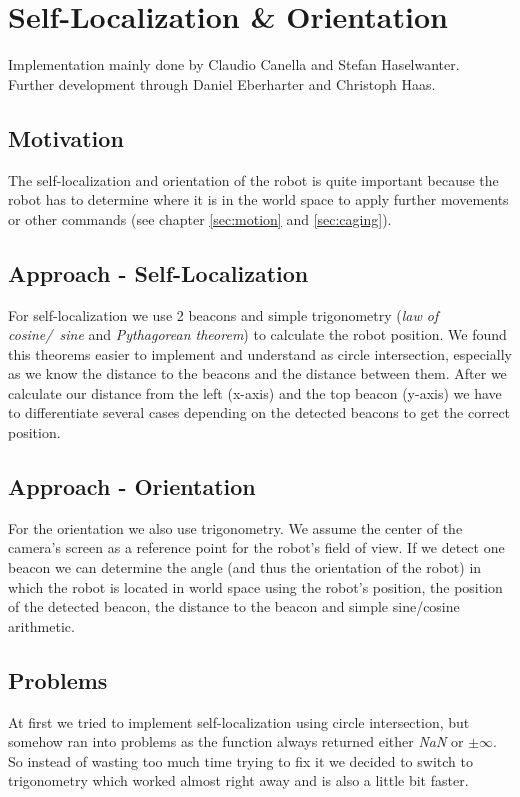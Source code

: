 \documentclass[703031]{iisreport}
\begin{document}
\section{Self-Localization \& Orientation}
\label{sec:localization}
Implementation mainly done by Claudio Canella and Stefan Haselwanter. \\
Further development through Daniel Eberharter and Christoph Haas.

\subsection{Motivation}
The self-localization and orientation of the robot is quite important because the robot has to determine where it is in the world space to apply further movements or other commands (see chapter \ref{sec:motion} and \ref{sec:caging}).

\subsection{Approach - Self-Localization}
For self-localization we use 2 beacons and simple trigonometry (\emph{law of \mbox{cosine}/\ sine} and \emph{Pythagorean theorem}) to calculate the robot position. We found this theorems easier to implement and understand as circle intersection, especially as we know the distance to the beacons and the distance between them. After we calculate our distance from the left (x-axis) and the top beacon (y-axis) we have to differentiate several cases depending on the detected beacons to get the correct position.

\subsection{Approach - Orientation}
For the orientation we also use trigonometry. We assume the center of the camera's screen as a reference point for the robot's field of view. If we detect one beacon we can determine the angle (and thus the orientation of the robot) in which the robot is located in world space using the robot's position, the position of the detected beacon, the distance to the beacon and simple sine/cosine arithmetic.

\subsection{Problems}
At first we tried to implement self-localization using circle intersection, but somehow ran into problems as the function always returned either \emph{NaN} or $\pm \infty$. So instead of wasting too much time trying to fix it we decided to switch to trigonometry which worked almost right away and is also a little bit faster.
\end{document}
